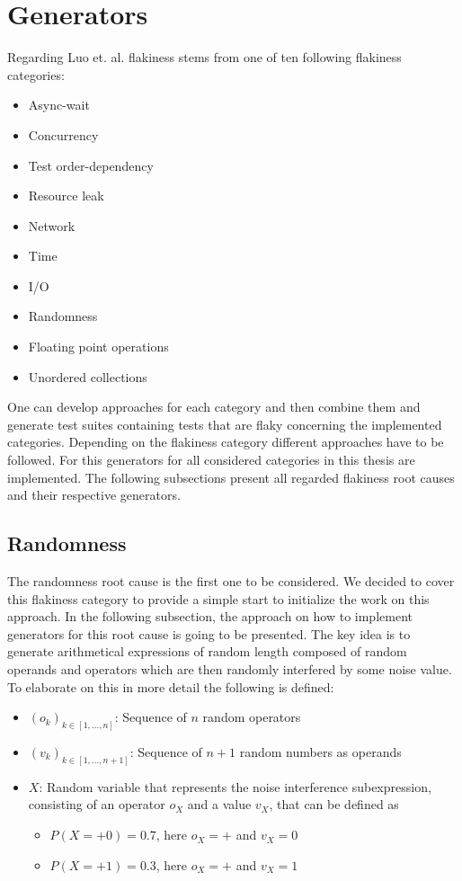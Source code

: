 \documentclass[
fancyheadings, %
%
%
]{stsreprt}
\begin{document}
\section{Generators}
Regarding Luo et. al. \cite{luo:2014} flakiness stems from one of ten following flakiness categories:
\begin{itemize}
    \item Async-wait
    \item Concurrency
    \item Test order-dependency
    \item Resource leak
    \item Network
    \item Time
    \item I/O
    \item Randomness
    \item Floating point operations
    \item Unordered collections
\end{itemize}
One can develop approaches for each category and then combine them and generate test suites containing tests that are flaky concerning the implemented categories. 
Depending on the flakiness category different approaches have to be followed. 
For this generators for all considered categories in this thesis are implemented. 
The following subsections present all regarded flakiness root causes and their respective generators. 

\subsection{Randomness}\label{sec:rand}
The randomness root cause is the first one to be considered.
We decided to cover this flakiness category to provide a simple start to initialize the work on this approach. 
In the following subsection, the approach on how to implement generators for this root cause is going to be presented. 
The key idea is to generate arithmetical expressions of random length composed of random operands and operators which are then randomly interfered by some noise value. 
To elaborate on this in more detail the following is defined: 
\begin{itemize}
    \item $(o_k)_{k \in [1, ..., n]}$: Sequence of $n$ random operators
    \item $(v_{k})_{k \in [1, ..., n+1]}$: Sequence of $n+1$ random numbers as operands 
    \item $X$: Random variable that represents the noise interference subexpression, consisting of an operator $o_X$ and a value $v_X$, that can be defined as
    \begin{itemize}
        \item $P(X=+0)=0.7$, here $o_X = +$ and $v_X = 0$
        \item $P(X=+1)=0.3$, here $o_X = +$ and $v_X = 1$
    \end{itemize}
\end{itemize} 
\end{document}
